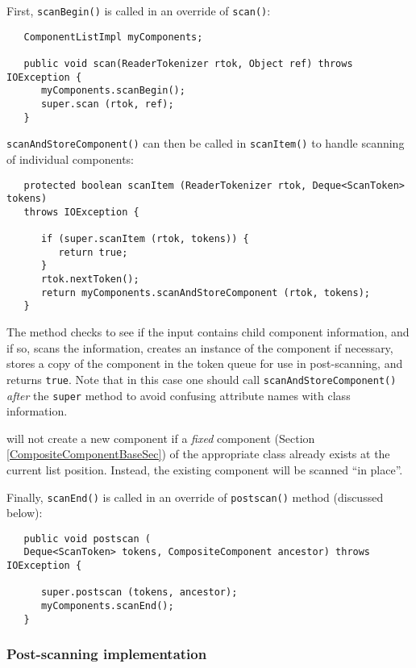 \documentclass{article}
\begin{document}
First, {\tt scanBegin()} is called in an override of {\tt scan()}:
\begin{lstlisting}
   ComponentListImpl myComponents; 

   public void scan(ReaderTokenizer rtok, Object ref) throws IOException {
      myComponents.scanBegin();
      super.scan (rtok, ref);
   }
\end{lstlisting}

{\tt scanAndStoreComponent()} can then be called in {\tt scanItem()} to
handle scanning of individual components:
\begin{lstlisting}
   protected boolean scanItem (ReaderTokenizer rtok, Deque<ScanToken> tokens)
   throws IOException {

      if (super.scanItem (rtok, tokens)) {
         return true;
      }
      rtok.nextToken();
      return myComponents.scanAndStoreComponent (rtok, tokens);
   }
\end{lstlisting}
The method checks to see if the input contains child component
information, and if so, scans the information, creates an instance of
the component if necessary, stores a copy of the component
in the token queue for use in post-scanning, and returns 
{\tt true}.
Note that in this case one should call {\tt scanAndStoreComponent()} {\it after}
the {\tt super} method to avoid confusing attribute names with class
information.

\begin{sideblock}
will not create a new component if a {\it fixed} component (Section
\ref{CompositeComponentBaseSec}) of the appropriate class already
exists at the current list position. Instead, the existing component
will be scanned ``in place''.
\end{sideblock}

Finally, {\tt scanEnd()} is called in an override of {\tt postscan()}
method (discussed below):
\begin{lstlisting}
   public void postscan (
   Deque<ScanToken> tokens, CompositeComponent ancestor) throws IOException {

      super.postscan (tokens, ancestor);
      myComponents.scanEnd();
   }
\end{lstlisting}

\subsubsection{Post-scanning implementation}
\end{document}
